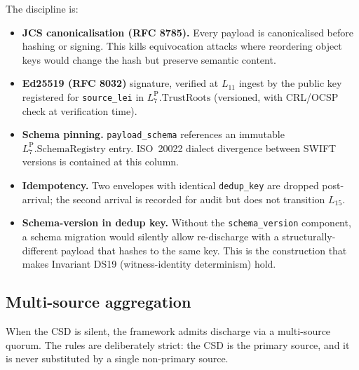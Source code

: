 \documentclass[11pt,a4paper]{article}
\begin{document}
The discipline is:
\begin{itemize}[nosep]
\item \textbf{JCS canonicalisation (RFC 8785).} Every payload is canonicalised before hashing or signing. This kills equivocation attacks where reordering object keys would change the hash but preserve semantic content.
\item \textbf{Ed25519 (RFC 8032)} signature, verified at $L_{11}$ ingest by the public key registered for \texttt{source\_lei} in $L_7^{\mathrm{P}}.\mathrm{TrustRoots}$ (versioned, with CRL/OCSP check at verification time).
\item \textbf{Schema pinning.} \texttt{payload\_schema} references an immutable $L_7^{\mathrm{P}}.\mathrm{SchemaRegistry}$ entry. ISO~20022 dialect divergence between SWIFT versions is contained at this column.
\item \textbf{Idempotency.} Two envelopes with identical \texttt{dedup\_key} are dropped post-arrival; the second arrival is recorded for audit but does not transition $L_{15}$.
\item \textbf{Schema-version in dedup key.} Without the \texttt{schema\_version} component, a schema migration would silently allow re-discharge with a structurally-different payload that hashes to the same key. This is the construction that makes Invariant DS19 (witness-identity determinism) hold.
\end{itemize}

\subsection{Multi-source aggregation}

When the CSD is silent, the framework admits discharge via a multi-source quorum. The rules are deliberately strict: the CSD is the primary source, and it is never substituted by a single non-primary source.
\end{document}
